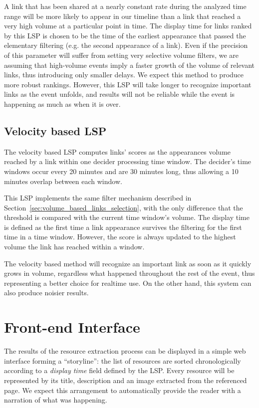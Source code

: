 \documentclass{sig-alternate}
\begin{document}
A link that has been shared at a nearly constant rate during the analyzed time range will be more likely to appear in our timeline than a link that reached a very high volume at a particular point in time. The display time for links ranked by this LSP is chosen to be the time of the earliest appearance that passed the elementary filtering (e.g. the second appearance of a link). Even if the precision of this parameter will suffer from setting very selective volume filters, we are assuming that high-volume events imply a faster growth of the volume of relevant links, thus introducing only smaller delays. We expect this method to produce more robust rankings. However, this LSP will take longer to recognize important links as the event unfolds, and results will not be reliable while the event is happening as much as when it is over.

\subsection{Velocity based LSP}
\label{sec:velocity_based_links_selection}
The velocity based LSP computes links' scores as the appearances volume reached by a link within one decider processing time window. The decider's time windows occur every 20 minutes and are 30 minutes long, thus allowing a 10 minutes overlap between each window.

This LSP implements the same filter mechanism described in Section~\ref{sec:volume_based_links_selection}, with the only difference that the threshold is compared with the current time window's volume. The display time is defined as the first time a link appearance survives the filtering for the first time in a time window. However, the score is always updated to the highest volume the link has reached within a window.

The velocity based method will recognize an important link as soon as it quickly grows in volume, regardless what happened throughout the rest of the event, thus representing a better choice for realtime use. On the other hand, this system can also produce noisier results.


\section{Front-end Interface}
\label{sec:front-end-interface}
The results of the resource extraction process can be displayed in a simple web interface forming a ``storyline'': the list of resources are sorted chronologically according to a \emph{display time} field defined by the LSP. Every resource will be represented by its title, description and an image extracted from the referenced page. We expect this arrangement to automatically provide the reader with a narration of what was happening.
\end{document}
